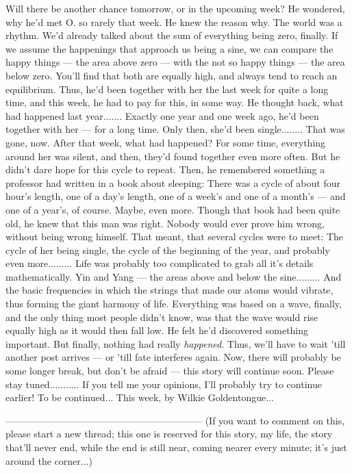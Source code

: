 Will there be another chance tomorrow, or in the upcoming week?
He wondered, why he'd met O. so rarely that week. 
He knew the reason why. 
The world was a rhythm. 
We'd already talked about the sum of everything being zero, finally. If we assume the happenings that approach us being a sine, we can compare the happy things --- the area above zero --- with the not so happy things --- the area below zero. 
You'll find that both are equally high, and always tend to reach an equilibrium. 
Thus, he'd been together with her the last week for quite a long time, and this week, he had to pay for this, in some way. He thought back, what had happened last year.......
Exactly one year and one week ago, he'd been together with her --- for a long time. Only then, she'd been single........
That was gone, now. 
After that week, what had happened?
For some time, everything around her was silent, and then, they'd found together even more often. 
But he didn't dare hope for this cycle to repeat. 
Then, he remembered something a professor had written in a book about sleeping: There was a cycle of about four hour's length, one of a day's length, one of a week's and one of a month's --- and one of a year's, of course. 
Maybe, even more. 
Though that book had been quite old, he knew that this man was right. 
Nobody would ever prove him wrong, without being wrong himself. 
That meant, that several cycles were to meet: The cycle of her being single, the cycle of the beginning of the year, and probably even more.........
Life was probably too complicated to grab all it's details mathematically. 
Yin and Yang --- the areas above and below the sine.........
And the basic frequencies in which the strings that made our atoms would vibrate, thus forming the giant harmony of life. 
Everything was based on a wave, finally, and the only thing most people didn't know, was that the wave would rise equally high as it would then fall low. 
He felt he'd discovered something important. 
But finally, nothing had really \emph{happened}. 
Thus, we'll have to wait 'till another post arrives --- or 'till fate interferes again. 
Now, there will probably be some longer break, but don't be afraid --- this story will continue soon. 
Please stay tuned...........
If you tell me your opinions, I'll probably try to continue earlier!
To be continued...
This week, by Wilkie Goldentongue...

--------------------------------------------------------------
(If you want to comment on this, please start a new thread; this one is reserved for this story, my life, the story that'll never end, while the end is still near, coming nearer every minute; it's just around the corner...)

